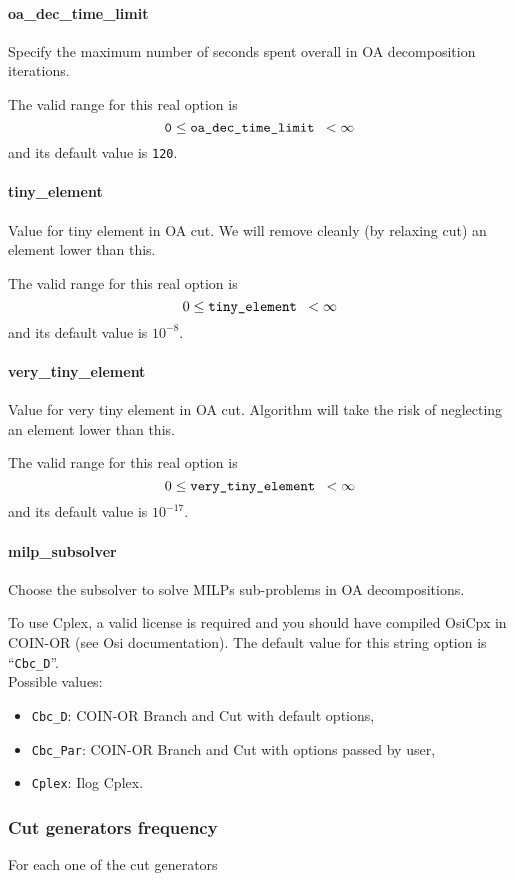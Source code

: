 \paragraph{oa\_dec\_time\_limit}
Specify the maximum number of seconds spent overall in OA decomposition iterations.

 The valid range for this real option is
$${\tt 0} \le \hbox{\tt oa\_dec\_time\_limit } <  \infty$$
and its default value is {\tt 120}.

\paragraph{tiny\_element}
Value for tiny element in OA cut.
We will remove cleanly (by relaxing cut) an element lower
than this.

The  valid range for this real option is
$$0 \le \hbox{\tt tiny\_element } <  \infty$$
and its default value is $10^{-8}$.

\paragraph{very\_tiny\_element}
Value for very tiny element in OA cut.
Algorithm will take the risk of neglecting an element lower
than this.

The  valid range for this real option is
$$0 \le \hbox{\tt very\_tiny\_element } <  \infty$$
and its default value is $10^{-17}$.

\paragraph{milp\_subsolver}
Choose the subsolver to solve MILPs sub-problems in OA decompositions.

  To use Cplex, a valid license is required and
you should have compiled OsiCpx in COIN-OR  (see Osi documentation).
The default value for this string option is ``{\tt Cbc\_D}''.
\\
Possible values:
\begin{itemize}
   \item {\tt Cbc\_D}: COIN-OR Branch and Cut with default options,
   \item {\tt Cbc\_Par}: COIN-OR Branch and Cut with options passed by user,
   \item {\tt Cplex}: Ilog Cplex.
\end{itemize}


\subsubsection{Cut generators frequency}
For each one of the cut generators

